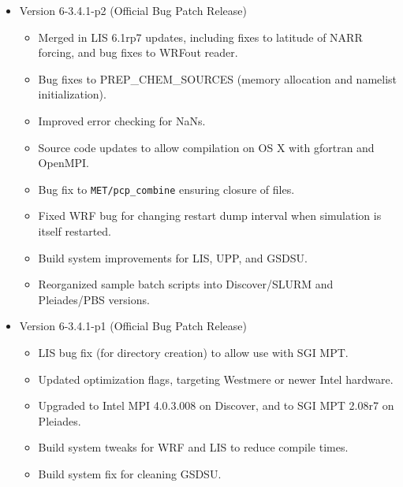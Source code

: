 \begin{itemize}
\begin{itemize}
  \end{itemize}

\item Version 6-3.4.1-p2 (Official Bug Patch Release)
  \begin{itemize}
  \item Merged in LIS 6.1rp7 updates, including fixes to latitude of NARR
    forcing, and bug fixes to WRFout reader.
  \item Bug fixes to PREP\_CHEM\_SOURCES (memory allocation and namelist
    initialization).
  \item Improved error checking for NaNs.
  \item Source code updates to allow compilation on OS X with gfortran
    and OpenMPI.
  \item Bug fix to \texttt{MET/pcp\_combine} ensuring closure of files.
  \item Fixed WRF bug for changing restart dump interval when simulation is
    itself restarted.
  \item Build system improvements for LIS, UPP, and GSDSU.
  \item Reorganized sample batch scripts into Discover/SLURM and Pleiades/PBS
    versions.
  \end{itemize}

\item Version 6-3.4.1-p1 (Official Bug Patch Release)
  \begin{itemize}
    \item LIS bug fix (for directory creation) to allow use with SGI MPT.
    \item Updated optimization flags, targeting Westmere or newer Intel
      hardware.
    \item Upgraded to Intel MPI 4.0.3.008 on Discover, and to SGI MPT 2.08r7
      on Pleiades.
    \item Build system tweaks for WRF and LIS to reduce compile times.
    \item Build system fix for cleaning GSDSU.
  \end{itemize}


\end{itemize}

